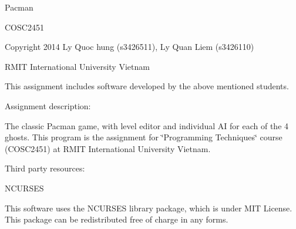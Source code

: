 Pacman

C\-O\-S\-C2451

Copyright 2014 Ly Quoc hung (s3426511), Ly Quan Liem (s3426110)

R\-M\-I\-T International University Vietnam

This assignment includes software developed by the above mentioned students.

Assignment description\-:

The classic Pacman game, with level editor and individual A\-I for each of the 4 ghosts. This program is the assignment for \char`\"{}\-Programming Techniques\char`\"{} course (C\-O\-S\-C2451) at R\-M\-I\-T International University Vietnam.

Third party resources\-:

N\-C\-U\-R\-S\-E\-S

This software uses the N\-C\-U\-R\-S\-E\-S library package, which is under M\-I\-T License. This package can be redistributed free of charge in any forms. 